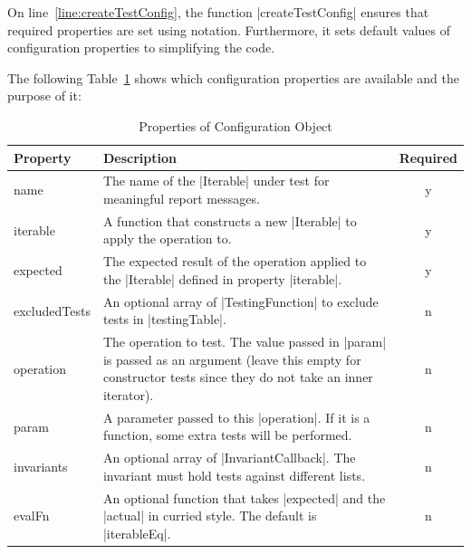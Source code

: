 On line~\ref{line:createTestConfig}, the function |createTestConfig| ensures
that required properties are set using notation. Furthermore, it sets default
values of configuration properties to simplifying the code.

The following Table~\ref{tab:testing_table} shows which configuration 
properties are available and the purpose of it:


\begin{table}[H]
  \center
  \begin{tabular}{ l m{10cm} c}
    \textbf{Property} & \textbf{Description} & \textbf{Required}\\
    \hline
    name            & The name of the |Iterable| under test for meaningful 
                      report messages. 
                    & y 
                    \\ 
    iterable        & A function that constructs a new |Iterable| to apply the 
                      operation to. 
                    & y 
                    \\  
    expected        & The expected result of the operation applied to the |Iterable|
                      defined in property |iterable|.
                    & 
                    y  \\ 
    excludedTests   & An optional array of |TestingFunction| to exclude tests
                      in |testingTable|. 
                    & n 
                    \\
    operation       & The operation to test. The value passed in |param| is
                      passed as an argument (leave this empty for constructor 
                      tests since they do not take an inner iterator). 
                    & n 
                    \\
    param           & A parameter passed to this |operation|. If it is a
                      function, some extra tests will be performed. 
                    & n
                    \\ 
    invariants      & An optional array of |InvariantCallback|. The invariant 
                      must hold tests against different lists. 
                    & n
                    \\
    evalFn          & An optional function that takes |expected| and the |actual| 
                      in curried style. The default is |iterableEq|.
                    & n 
                    \\
  \end{tabular}
  \caption{Properties of Configuration Object}
\label{tab:testing_table}
\end{table}


